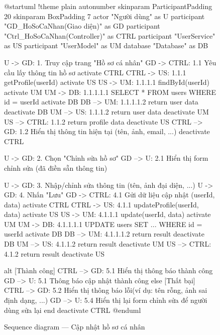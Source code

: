 \documentclass[12pt,a4paper]{report}
\begin{document}
\begin{figure}[H]
    \centering
    \begin{plantuml}
        @startuml
        !theme plain
        autonumber
        skinparam ParticipantPadding 20
        skinparam BoxPadding 7
        actor "Người dùng" as U
        participant "GD_HoSoCaNhan\n(Giao diện)" as GD
        participant "Ctrl_HoSoCaNhan\n(Controller)" as CTRL
        participant "UserService" as US
        participant "UserModel" as UM
        database "Database" as DB

        U -> GD: 1. Truy cập trang "Hồ sơ cá nhân"
        GD -> CTRL: 1.1 Yêu cầu lấy thông tin hồ sơ
        activate CTRL
        CTRL -> US: 1.1.1 getProfile(userId)
        activate US
        US -> UM: 1.1.1.1 findById(userId)
        activate UM
        UM -> DB: 1.1.1.1.1 SELECT * FROM users WHERE id = userId
        activate DB
        DB --> UM: 1.1.1.1.2 return user data
        deactivate DB
        UM --> US: 1.1.1.2 return user data
        deactivate UM
        US --> CTRL: 1.1.2 return profile data
        deactivate US
        CTRL --> GD: 1.2 Hiển thị thông tin hiện tại (tên, ảnh, email, ...)
        deactivate CTRL

        U -> GD: 2. Chọn "Chỉnh sửa hồ sơ"
        GD --> U: 2.1 Hiển thị form chỉnh sửa (đã điền sẵn thông tin)

        U -> GD: 3. Nhập/chỉnh sửa thông tin (tên, ảnh đại diện, ...)
        U -> GD: 4. Nhấn "Lưu"
        GD -> CTRL: 4.1 Gửi dữ liệu cập nhật (userId, data)
        activate CTRL
        CTRL -> US: 4.1.1 updateProfile(userId, data)
        activate US
        US -> UM: 4.1.1.1 update(userId, data)
        activate UM
        UM -> DB: 4.1.1.1.1 UPDATE users SET ... WHERE id = userId
        activate DB
        DB --> UM: 4.1.1.1.2 return result
        deactivate DB
        UM --> US: 4.1.1.2 return result
        deactivate UM
        US --> CTRL: 4.1.2 return result
        deactivate US

        alt [Thành công]
          CTRL --> GD: 5.1 Hiển thị thông báo thành công
          GD --> U: 5.1 Thông báo cập nhật thành công
        else [Thất bại]
          CTRL --> GD: 5.2 Hiển thị thông báo lỗi\n(ví dụ: tên rỗng, ảnh sai định dạng, ...)
          GD --> U: 5.4 Hiển thị lại form chỉnh sửa để người dùng sửa lại
        end
        deactivate CTRL
        @enduml
    \end{plantuml}
    \caption{Sequence diagram --- Cập nhật hồ sơ cá nhân}
\end{figure}
\end{document}
